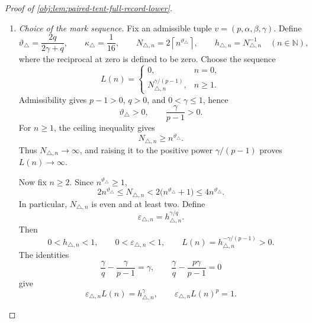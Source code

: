 \begin{proof}[Proof of \cref{obj:lem:paired-tent-full-record-lower}]
\begin{enumerate}
\item \emph{Choice of the mark sequence.}
Fix an admissible tuple \(v=(p,\alpha,\beta,\gamma)\). Define
\[
\vartheta_\triangle=\frac{2q}{2\gamma+q},
\qquad
\kappa_\triangle=\frac1{16},
\qquad
N_{\triangle,n}=2\left\lceil n^{\vartheta_\triangle}\right\rceil,
\qquad
h_{\triangle,n}=N_{\triangle,n}^{-1}
\quad(n\in\mathbb N),
\]
where the reciprocal at zero is defined to be zero. Choose the sequence
\[
L(n)=
\begin{cases}
0,&n=0,\\
N_{\triangle,n}^{\gamma/(p-1)},&n\ge1.
\end{cases}
\]
Admissibility gives \(p-1>0\), \(q>0\), and \(0<\gamma\le1\), hence
\[
\vartheta_\triangle>0,
\qquad
\frac{\gamma}{p-1}>0.
\]
For \(n\ge1\), the ceiling inequality gives
\[
N_{\triangle,n}\ge n^{\vartheta_\triangle}.
\]
Thus \(N_{\triangle,n}\to\infty\), and raising it to the positive power
\(\gamma/(p-1)\) proves \(L(n)\to\infty\).

Now fix \(n\ge2\). Since \(n^{\vartheta_\triangle}\ge1\),
\[
2n^{\vartheta_\triangle}
\le N_{\triangle,n}
<2\bigl(n^{\vartheta_\triangle}+1\bigr)
\le4n^{\vartheta_\triangle}.
\]
In particular, \(N_{\triangle,n}\) is even and at least two. Define
\[
\varepsilon_{\triangle,n}
=h_{\triangle,n}^{\gamma/q}.
\]
Then
\[
0<h_{\triangle,n}<1,
\qquad
0<\varepsilon_{\triangle,n}<1,
\qquad
L(n)=h_{\triangle,n}^{-\gamma/(p-1)}>0.
\]
The identities
\[
\frac{\gamma}{q}-\frac{\gamma}{p-1}=\gamma,
\qquad
\frac{\gamma}{q}-\frac{p\gamma}{p-1}=0
\]
give
\[
\varepsilon_{\triangle,n}L(n)=h_{\triangle,n}^{\gamma},
\qquad
\varepsilon_{\triangle,n}L(n)^p=1.
\]


\end{enumerate}
\end{proof}
